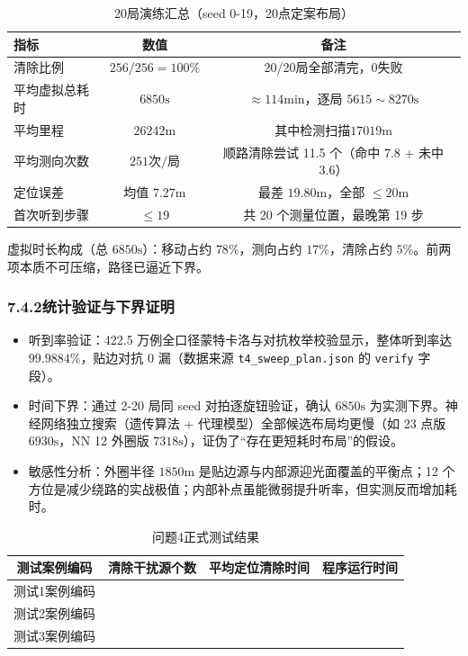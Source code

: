 \documentclass[UTF8, zihao=5,AutoFakeBold=2]{ctexart}
\begin{document}
\begin{table}[h]
\centering
\caption{20局演练汇总（seed 0-19，20点定案布局）}
\begin{tabular}{lcc}
\toprule
指标 & 数值 & 备注 \\
\midrule
清除比例 & $256/256 = 100\%$ & 20/20局全部清完，0失败 \\
平均虚拟总耗时 & $6850\text{s}$ & $\approx 114\text{min}$，逐局 $5615 \sim 8270\text{s}$ \\
平均里程 & $26242\text{m}$ & 其中检测扫描$17019\text{m}$ \\
平均测向次数 & $251\text{次/局}$ & 顺路清除尝试 11.5 个（命中 7.8 + 未中 3.6） \\
定位误差 & 均值 $7.27\text{m}$ & 最差 $19.80\text{m}$，全部 $\le 20\text{m}$ \\
首次听到步骤 & $\le 19$ & 共 20 个测量位置，最晚第 19 步 \\
\bottomrule
\end{tabular}
\end{table}

虚拟时长构成（总 $6850\text{s}$）：移动占约 $78\%$，测向占约 $17\%$，清除占约 $5\%$。前两项本质不可压缩，路径已逼近下界。

\subsubsection*{7.4.2统计验证与下界证明}
\begin{itemize}
    \item 听到率验证：422.5 万例全口径蒙特卡洛与对抗枚举校验显示，整体听到率达 $99.9884\%$，贴边对抗 0 漏（数据来源 \texttt{t4\_sweep\_plan.json} 的 \texttt{verify} 字段）。
    \item 时间下界：通过 2-20 局同 seed 对拍逐旋钮验证，确认 $6850\text{s}$ 为实测下界。神经网络独立搜索（遗传算法 + 代理模型）全部候选布局均更慢（如 23 点版 $6930\text{s}$，NN 12 外圈版 $7318\text{s}$），证伪了“存在更短耗时布局”的假设。
    \item 敏感性分析：外圈半径 $1850\text{m}$ 是贴边源与内部源迎光面覆盖的平衡点；12 个方位是减少绕路的实战极值；内部补点虽能微弱提升听率，但实测反而增加耗时。
\end{itemize}
\begin{table}[h]
    \centering
    \caption{问题4正式测试结果}
    \begin{tabular}{cccc}
        \toprule
        测试案例编码 & 清除干扰源个数 & 平均定位清除时间 & 程序运行时间 \\
        \midrule
        测试1案例编码 & & & \\
        测试2案例编码 & & & \\
        测试3案例编码 & & & \\
        \bottomrule
    \end{tabular}
\end{table}
\end{document}
